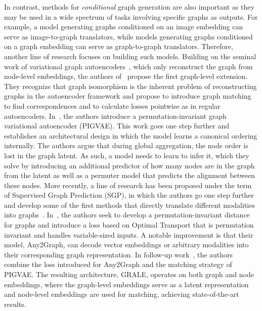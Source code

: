 In contrast, methods for \emph{conditional} graph generation are also important as they may be used in a wide spectrum of tasks
involving specific graphs as outputs.
For example, a model generating graphs conditioned on an image embedding can serve as image-to-graph translators, while
models generating graphs conditioned on a graph embedding can serve as graph-to-graph translators.
Therefore, another line of research focuses on building such models.
Building on the seminal work of variational graph autoencoders~\cite{vgae}, which only reconstruct the graph
from node-level embeddings, the authors of~\cite{graphvae} propose the first graph-level extension.
They recognize that graph isomorphism is the inherent problem of reconstructing graphs in the autoencoder framework
and propose to introduce graph matching to find correspondences and to calculate losses pointwise as in regular
autoencoders.
In~\cite{winter2021pigvae}, the authors introduce a permutation-invariant graph variational autoencoder (PIGVAE).
This work goes one step further and establishes an architectural design in which the model learns a canonical ordering internally.
The authors argue that during global aggregation, the node order is lost in the graph latent.
As such, a model needs to learn to infer it, which they solve by introducing an additional predictor of how many nodes are in
the graph from the latent as well as a permuter model that predicts the alignment between these nodes.
More recently, a line of research has been proposed under the term of Supervised Graph Prediction (SGP), in which the authors
go one step further and develop some of the first methods that directly translate different modalities into
graphs~\cite{krzakala2024framework,any2graph2024, grale2025}.
In~\cite{any2graph2024}, the authors seek to develop a permutation-invariant distance for graphs and introduce a loss based
on Optimal Transport that is permutation invariant and handles variable-sized inputs.
A notable improvement is that their model, Any2Graph, can decode vector embeddings or arbitrary modalities into their corresponding
graph representation.
In follow-up work~\cite{grale2025}, the authors combine the loss introduced for Any2Graph and the matching strategy of PIGVAE\@.
The resulting architecture, GRALE, operates on both graph and node embeddings, where the graph-level embeddings serve as a latent
representation and node-level embeddings are used for matching, achieving state-of-the-art results.

